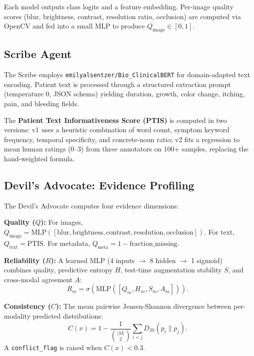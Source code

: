\documentclass[conference]{IEEEtran}
\begin{document}
Each model outputs class logits and a feature embedding. Per-image quality scores (blur, brightness, contrast, resolution ratio, occlusion) are computed via OpenCV and fed into a small MLP to produce $Q_{\text{image}} \in [0,1]$.

\subsection{Scribe Agent}

The Scribe employs \texttt{emilyalsentzer/Bio\_ClinicalBERT} \cite{alsentzer2019} for domain-adapted text encoding. Patient text is processed through a structured extraction prompt (temperature 0, JSON schema) yielding duration, growth, color change, itching, pain, and bleeding fields.

The \textbf{Patient Text Informativeness Score (PTIS)} is computed in two versions: v1 uses a heuristic combination of word count, symptom keyword frequency, temporal specificity, and concrete-noun ratio; v2 fits a regression to mean human ratings (0--3) from three annotators on 100+ samples, replacing the hand-weighted formula.

\subsection{Devil's Advocate: Evidence Profiling}
\label{sec:evidence}

The Devil's Advocate computes four evidence dimensions:

\textbf{Quality ($Q$):} For images, $Q_{\text{image}} = \text{MLP}([\text{blur}, \text{brightness}, \text{contrast}, \text{resolution}, \text{occlusion}])$. For text, $Q_{\text{text}} = \text{PTIS}$. For metadata, $Q_{\text{meta}} = 1 - \text{fraction\_missing}$.

\textbf{Reliability ($R$):} A learned MLP (4 inputs $\rightarrow$ 8 hidden $\rightarrow$ 1 sigmoid) combines quality, predictive entropy $H$, test-time augmentation stability $S$, and cross-modal agreement $A$:
\begin{equation}
R_m = \sigma\left( \text{MLP}\left([Q_m, H_m, S_m, A_m]\right) \right).
\end{equation}

\textbf{Consistency ($C$):} The mean pairwise Jensen-Shannon divergence between per-modality predicted distributions:
\begin{equation}
C(x) = 1 - \frac{1}{\binom{|M|}{2}} \sum_{i<j} D_{\text{JS}}(p_i \| p_j).
\end{equation}
A \texttt{conflict\_flag} is raised when $C(x) < 0.3$.
\end{document}
